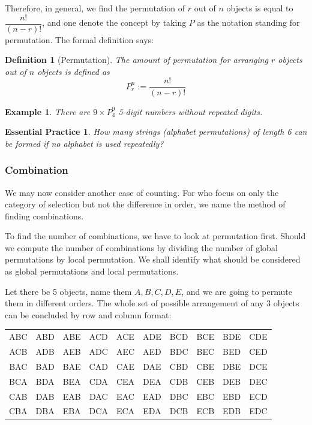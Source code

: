 \documentclass[12pt]{article}
\newtheorem{definition}{Definition}[section]
\newtheorem*{example}{Example}
\newtheorem{exercise}{Essential Practice}[subsection]
\begin{document}
    Therefore, in general, we find the permutation of $r$ out of $n$ objects is equal to $\dfrac{n!}{(n-r)!}$, and one denote the concept by taking $P$ as the notation standing for permutation. The formal definition says:

    \begin{definition}[Permutation]
        The amount of permutation for arranging $r$ objects out of $n$ objects is defined as $$P_r^n:=\frac{n!}{(n-r)!}$$
    \end{definition}

    \begin{example}
        There are $9\times P_4^9$ 5-digit numbers without repeated digits.
    \end{example}

    \begin{exercise}
        How many strings (alphabet permutations) of length 6 can be formed if no alphabet is used repeatedly?
    \end{exercise}

    \subsubsection*{Combination}

    We may now consider another case of counting. For who focus on only the category of selection but not the difference in order, we name the method of finding combinations.

    To find the number of combinations, we have to look at permutation first. Should we compute the number of combinations by dividing the number of global permutations by local permutation. We shall identify what should be considered as global permutations and local permutations.

    Let there be 5 objects, name them $A,B,C,D,E$, and we are going to permute them in different orders. The whole set of possible arrangement of any 3 objects can be concluded by row and column format:

    \begin{center}
        \begin{tabular}{c c c c c c c c c c}
            ABC&ABD&ABE&ACD&ACE&ADE&BCD&BCE&BDE&CDE\\
            ACB&ADB&AEB&ADC&AEC&AED&BDC&BEC&BED&CED\\
            BAC&BAD&BAE&CAD&CAE&DAE&CBD&CBE&DBE&DCE\\
            BCA&BDA&BEA&CDA&CEA&DEA&CDB&CEB&DEB&DEC\\
            CAB&DAB&EAB&DAC&EAC&EAD&DBC&EBC&EBD&ECD\\
            CBA&DBA&EBA&DCA&ECA&EDA&DCB&ECB&EDB&EDC
        \end{tabular}
    \end{center}
\end{document}
